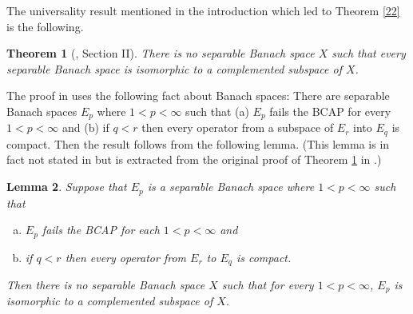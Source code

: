 \documentclass[11pt]{amsart}
\newtheorem{theorem}{Theorem}[section]
\newtheorem{lemma}[theorem]{Lemma}
\theoremstyle{definition}
\numberwithin{equation}{section}
\begin{document}
The universality result mentioned in the introduction which led to Theorem \ref{22} is the following.
\begin{theorem}[\cite{Johnson}, Section II]\label{23}
There is no separable Banach space $X$ such that every separable Banach space is isomorphic to a complemented subspace of $X$.
\end{theorem}
The proof in \cite{Johnson} uses the following fact about Banach spaces: There are separable Banach spaces $E_{p}$ where $1<p<\infty$ such that (a) $E_{p}$ fails the BCAP
for every $1<p<\infty$ and (b) if $q<r$ then every operator from a subspace of $E_{r}$ into $E_{q}$ is compact. Then the result follows from the following lemma. (This
lemma is in fact not stated in \cite{Johnson} but is extracted from the original proof of Theorem \ref{23} in \cite{Johnson}.)
\begin{lemma}\label{24}
Suppose that $E_{p}$ is a separable Banach space where $1<p<\infty$ such that
\begin{enumerate}[(a)]
\item $E_{p}$ fails the BCAP for each $1<p<\infty$ and
\item if $q<r$ then every operator from $E_{r}$ to $E_{q}$ is compact.
\end{enumerate}
Then there is no separable Banach space $X$ such that for every $1<p<\infty$, $E_{p}$ is isomorphic to a complemented subspace of $X$.
\end{lemma}
\end{document}
